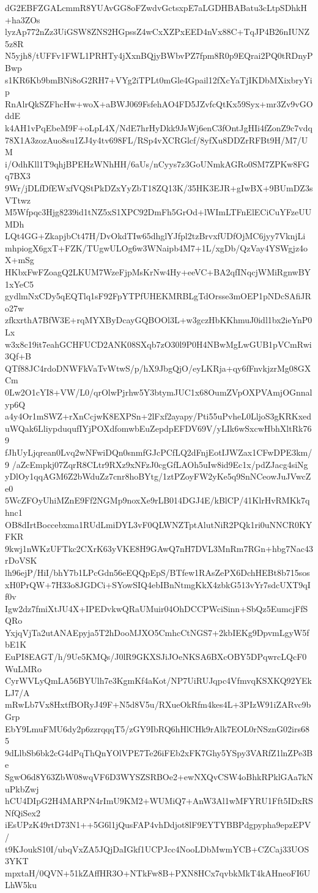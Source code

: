 dG2EBFZGALcmmR8YUAvGG8oFZwdvGctsxpE7aLGDHBABatu3cLtpSDhkH+ha3ZOs
lyzAp772nZz3UiGSW8ZNS2HGpssZ4wCxXZPxEED4nVx88C+TqJP4B26nIUNZ5z8R
N5yjh8/tUFFv1FWL1PRHTy4jXxnBQjyBWbvPZ7fpm8R0p9EQrai2PQ0tRDnyPBwp
s1KR6Kb9bmBNi8oG2RH7+VYg2iTPLt0mGle4Gpail12fXcYaTjIKDbMXixbryYip
RnAlrQkSZFhcHw+woX+aBWJ069FsfehAO4FD5JZvfcQtKx59Syx+mr3Zv9vGOddE
k4AH1vPqEbeM9F+oLpL4X/NdE7hrHyDkk9JsWj6enC3fOntJgHIi4fZonZ9c7vdq
78X1A3zozAuo8su1ZJ4y4tv698FL/RSp4vXCRGlcf/8yfXu8DDZrRFBt9H/M7/UM
i/OdhKll1T9qhjBPEHzWNhHH/6aUs/nCyys7z3GoUNmkAGRo0SM7ZPKw8FGq7BX3
9Wr/jDLfDfEWxfVQStPkDZxYyZbT18ZQ13K/35HK3EJR+gIwBX+9BUmDZ3sVTtwz
M5Wfpqc3Hjg8239id1tNZ5xS1XPC92DmFh5GrOd+lWImLTFnElECiCuYFzeUUMDh
LQt4GG+ZkapjbCt47H/DvOkdTIw65dhglYJfpl2tzBrvxfUDfOjMC6jyy7VknjLi
mhpiogX6gxT+FZK/TUgwULOg6w3WNaipb4M7+1L/xgDb/QzVay4YSWgjz4oX+mSg
HKbxFwFZoagQ2LKUM7WzeFjpMsKrNw4Hy+eeVC+BA2qfINqcjWMiRgnwBY1xYeC5
gydlmNxCDy5qEQTlq1sF92FpYTPfUHEKMRBLgTdOrsse3mOEP1pNDcSAfiJRo27w
zfkxrthA7BfW3E+rqMYXByDcayGQBOOl3L+w3gczHbKKhmuJ0idl1bx2ieYnP0Lx
w3x8c19it7eahGCHFUCD2ANK08SXqb7zO30l9P0H4NBwMgLwGUB1pVCmRwi3Qf+B
QTf88JC4rdoDNWFkVaTvWtwS/p/hX9JbgQjO/eyLKRja+qy6fFnvkjzrMg08GXCm
0Lw2O1cYI8+VW/L0/qrOlwPjrhw5Y3btymJUC1x68OumZVpOXPVAmjOGnnalyp6Q
a4y4Or1mSWZ+rXnCcjwK8EXPSn+2lFxf2ayapy/Pti55uPvheL0LljoS3gKRKxed
uWQak6LliypduqufIYjPOXdfomwbEuZepdpEFDV69V/yLIk6wSxcwHbhXltRk769
fJhUyLjqrean0Lvq2wNFwiDQn0snmfGJcPCfLQ2dFnjEotIJWZax1CFwDPE3km/9
/aZcEmpkj07ZqrR8CLtr9RXz9xNFzJ0cgGfLAOh5uIw8id9Ec1x/pdZJacg4siNg
yDlOy1qqAGM6Z2bWduZz7cnr8hoBYtg/1ztPZoyFW2yKe5q9SnNCeowJuJVwcZe0
5WcZFOyUhiMZnE9Ff2NGMp9noxXe9rLB014DGJ4E/kBlCP/41KlrHvRMKk7qhnc1
OB8dIrtBoccebxma1RUdLmiDYL3vF0QLWNZTptAlutNiR2PQk1ri0uNNCR0KYFKR
9kwj1nWKzUFTkc2CXrK63yVKE8H9GAwQ7nH7DVL3MnRm7RGn+hbg7Nac43rDoVSK
lh96ejP/HiI/bhY7b1LPcGdn56eEQQpEpS/BTfew1RAsZePX6DchHEBt8b715sos
xH0PrQW+7H33o8JGDCi+SYowSIQ4ebIBnNtmgKkX4zbkG513vYr7sdcUXT9qIf0v
Igw2dz7fmiXtJU4X+IPEDvkwQRaUMuir04OhDCCPWciSinn+SbQz5EumcjFfSQRo
YxjqVjTa2utANAEpyja5T2hDooMJXO5CmhcCtNGS7+2kbIEKg9DpvmLgyW5fbE1K
EuPI8EAGT/h/9Ue5KMQs/J0lR9GKXSJiJOeNKSA6BXcOBY5DPqwrcLQcF0WuLMRo
CyrWVLyQmLA56BYUlh7e3KgmKf4aKot/NP7UiRUJqpc4VfmvqKSXKQ92YEkLJ7/A
mRwLb7Vx8HxtfBORyJ49F+N5d8V5u/RXueOkRfm4kes4L+3PIzW91iZARvc9bGrp
EbY9LmuFMU6dy2p6zzrqqqT5/zGY9IbRQ6hHlCHk9rAlk7EOL0rNSznG02irs685
9dLlbSb6bk2cG4dPqThQnYOlVPE7Te26iFEb2xFK7Ghy5YSpy3VARfZ1lnZPe3Be
SgwO6d8Y63ZbW08wqVF6D3WYSZSRBOe2+ewNXQvCSW4oBhkRPklGAa7kNuPkbZwj
hCU4DIpG2H4MARPN4rImU9KM2+WUMiQ7+AnW3Al1wMFYRU1Fft5IDxRSNfQiSex2
iEsUPzK49rtD73N1++5G6l1jQusFAP4vhDdjot8lF9EYTYBBPdgpypha9epzEPV/
t9KJoukS10I/ubqVxZA5JQjDaIGkf1UCPJcc4NooLDbMwmYCB+CZCaj33UOS3YKT
mpxtaH/0QVN+51kZAffHR3O+NTkFw8B+PXN8HCx7qvbkMkT4kAHneoFI6ULhW5ku
